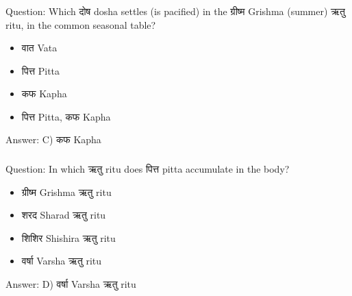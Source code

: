 \begin{frame}[fragile]\frametitle{}

Question: Which दोष dosha settles (is pacified) in the ग्रीष्म Grishma (summer) ऋतु ritu, in the common seasonal table?

\begin{itemize}
\item[A)] वात Vata
\item[B)] पित्त Pitta
\item[C)] कफ Kapha
\item[D)] पित्त Pitta, कफ Kapha
\end{itemize}

Answer: C) कफ Kapha
\end{frame}

\begin{frame}[fragile]\frametitle{}

Question: In which ऋतु ritu does पित्त pitta accumulate in the body?

\begin{itemize}
\item[A)] ग्रीष्म Grishma ऋतु ritu
\item[B)] शरद Sharad ऋतु ritu
\item[C)] शिशिर Shishira ऋतु ritu
\item[D)] वर्षा Varsha ऋतु ritu
\end{itemize}

Answer: D) वर्षा Varsha ऋतु ritu
\end{frame}

%
%
%

